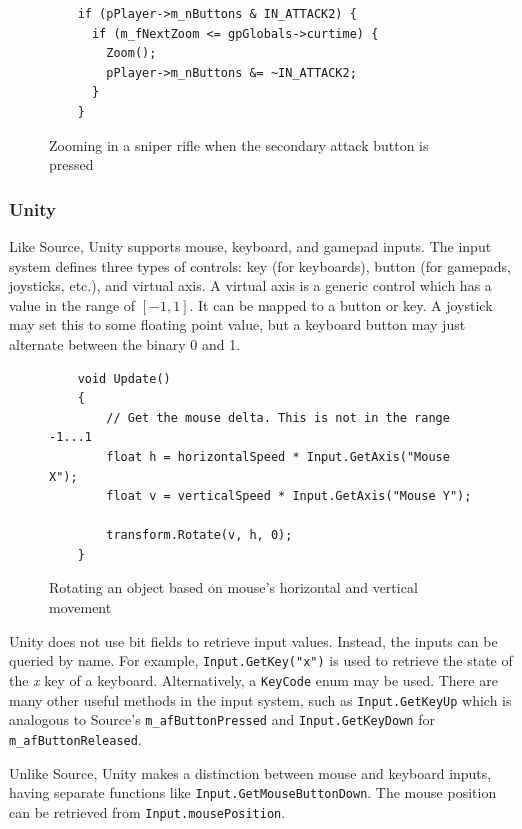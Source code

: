 \documentclass[a4paper, 12pt]{scrartcl}
\begin{document}
\begin{figure}[!htb]
  \begin{verbatim}
    if (pPlayer->m_nButtons & IN_ATTACK2) {
      if (m_fNextZoom <= gpGlobals->curtime) {
        Zoom();
        pPlayer->m_nButtons &= ~IN_ATTACK2;
      }
    }
  \end{verbatim}
  \caption{Zooming in a sniper rifle when the secondary attack button is pressed}
  \label{fig:source_sniper_zoom}
\end{figure}

\subsubsection{Unity}
Like Source, Unity supports mouse, keyboard, and gamepad inputs. The input system defines three types of controls: key (for keyboards), button (for gamepads, joysticks, etc.), and virtual axis. A virtual axis is a generic control which has a value in the range of $[-1,1]$. It can be mapped to a button or key. A joystick may set this to some floating point value, but a keyboard button may just alternate between the binary 0 and 1.

\begin{figure}[!htb]
  \begin{verbatim}
    void Update()
    {
        // Get the mouse delta. This is not in the range -1...1
        float h = horizontalSpeed * Input.GetAxis("Mouse X");
        float v = verticalSpeed * Input.GetAxis("Mouse Y");

        transform.Rotate(v, h, 0);
    }
  \end{verbatim}
  \caption{Rotating an object based on mouse's horizontal and vertical movement}
  \label{fig:unity_input}
\end{figure}

Unity does not use bit fields to retrieve input values. Instead, the inputs can be queried by name. For example, \texttt{Input.GetKey("x")} is used to retrieve the state of the \textit{x} key of a keyboard. Alternatively, a \texttt{KeyCode} enum may be used. There are many other useful methods in the input system, such as \texttt{Input.GetKeyUp} which is analogous to Source's \texttt{m\_afButtonPressed} and \texttt{Input.GetKeyDown} for \texttt{m\_afButtonReleased}.

Unlike Source, Unity makes a distinction between mouse and keyboard inputs, having separate functions like \texttt{Input.GetMouseButtonDown}. The mouse position can be retrieved from \texttt{Input.mousePosition}.
\end{document}
